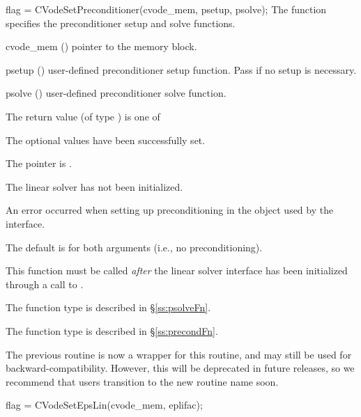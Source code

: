 {
  flag = CVodeSetPreconditioner(cvode\_mem, psetup, psolve);
}
{
  The function  specifies the preconditioner
  setup and solve functions.
}
{
  \begin{args}
  \item[cvode\_mem] ()
    pointer to the {\cvodes} memory block.
  \item[psetup] ()
    user-defined preconditioner setup function.
    Pass  if no setup is necessary.
  \item[psolve] ()
    user-defined preconditioner solve function.
  \end{args}
}
{
  The return value  (of type ) is one of
  \begin{args}
  \item[\Id{CVLS\_SUCCESS}]
    The optional values have been successfully set.
  \item[\Id{CVLS\_MEM\_NULL}]
    The  pointer is .
  \item[\Id{CVLS\_LMEM\_NULL}]
    The {\cvls} linear solver has not been initialized.
  \item[\Id{CVLS\_SUNLS\_FAIL}]
    An error occurred when setting up preconditioning in the
    {\sunlinsol} object used by the {\cvls} interface.
  \end{args}
}
{
  The default is  for both arguments (i.e., no
  preconditioning).

  This function must be called \emph{after} the {\cvls} linear solver
  interface has been initialized through a call to
  .

  The function type  is described in \S\ref{ss:psolveFn}.

  The function type  is described in \S\ref{ss:precondFn}.

  The previous routine  is now a wrapper
  for this routine, and may still be used for backward-compatibility.
  However, this will be deprecated in future releases, so we recommend
  that users transition to the new routine name soon.
}
{
  flag = CVodeSetEpsLin(cvode\_mem, eplifac);
}
